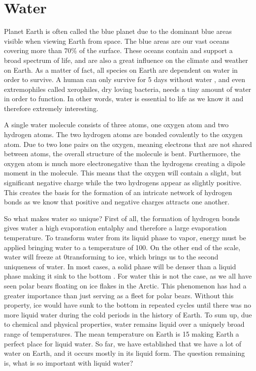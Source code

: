\section{Water}
Planet Earth is often called the blue planet due to the dominant blue areas visible when viewing Earth from space.
The blue areas are our vast oceans covering more than 70\% \cite{WikiEarth} of the surface.
These oceans contain and support a broad spectrum of life, and are also a great influence on the climate and weather on Earth.
As a matter of fact, all species on Earth are dependent on water in order to survive.
A human can only survive for 5 days without water \cite{SurviveWater}, and even extremophiles called xerophiles, dry loving bacteria, needs a tiny amount of water in order to function.
In other words, water is essential to life as we know it and therefore extremely interesting. 

A single water molecule consists of three atoms, one oxygen atom and two hydrogen atoms.
The two hydrogen atoms are bonded covalently to the oxygen atom.
Due to two lone pairs on the oxygen, meaning electrons that are not shared between atoms, the overall structure of the molecule is bent.
Furthermore, the oxygen atom is much more electronegative than the hydrogens creating a dipole moment in the molecule.
This means that the oxygen will contain a slight, but significant negative charge while the two hydrogens appear as slightly positive.
This creates the basis for the formation of an intricate network of hydrogen bonds as we know that positive and negative charges attracts one another.  

So what makes water so unique?
First of all, the formation of hydrogen bonds gives water a high evaporation entalphy and therefore a large evaporation temperature.
To transform water from its liquid phase to vapor, energy must be applied bringing water to a temperature of 100\textcelsius.
On the other end of the scale, water will freeze at 0\textcelsius transforming to ice, which brings us to the second uniqueness of water.
In most cases, a solid phase will be denser than a liquid phase making it sink to the bottom \cite{SolidWater}.
For water this is not the case, as we all have seen polar bears floating on ice flakes in the Arctic.
This phenomenon has had a greater importance than just serving as a fleet for polar bears.
Without this property, ice would have sunk to the bottom in repeated cycles until there was no more liquid water during the cold periods in the history of Earth.
To sum up, due to chemical and physical properties, water remains liquid over a uniquely broad range of temperatures.
The mean temperature on Earth is 15\textcelsius \cite{WikiEarth} making Earth a perfect place for liquid water.
So far, we have established that we have a lot of water on Earth, and it occurs mostly in its liquid form.
The question remaining is, what is so important with liquid water? 

